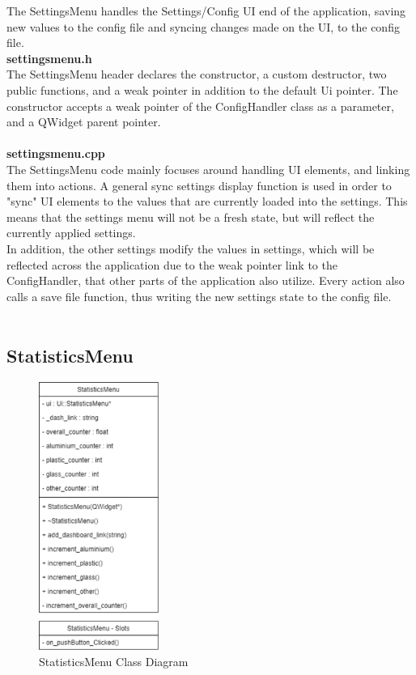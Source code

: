 \documentclass[conference]{IEEEtran}
\begin{document}
The SettingsMenu handles the Settings/Config UI end of the application, saving new values to the config file and syncing changes made on the UI, to the config file.\\


\textbf{settingsmenu.h}~\\

The SettingsMenu header declares the constructor, a custom destructor, two public functions, and a weak pointer in addition to the default Ui pointer. The constructor accepts a weak pointer of the ConfigHandler class as a parameter, and a QWidget parent pointer. ~\\~\\


\textbf{settingsmenu.cpp}~\\

The SettingsMenu code mainly focuses around handling UI elements, and linking them into actions. A general sync settings display function is used in order to "sync" UI elements to the values that are currently loaded into the settings. This means that the settings menu will not be a fresh state, but will reflect the currently applied settings.\\

In addition, the other settings modify the values in settings, which will be reflected across the application due to the weak pointer link to the ConfigHandler, that other parts of the application also utilize. Every action also calls a save file function, thus writing the new settings state to the config file.~\\~\\

\subsection{StatisticsMenu}

\begin{figure}[h]
    \centering
    \includegraphics[width=0.35\textwidth]{images/code_diagrams/statisticsmenu.eps}
    \caption{StatisticsMenu Class Diagram}
\end{figure}~\\
\end{document}
